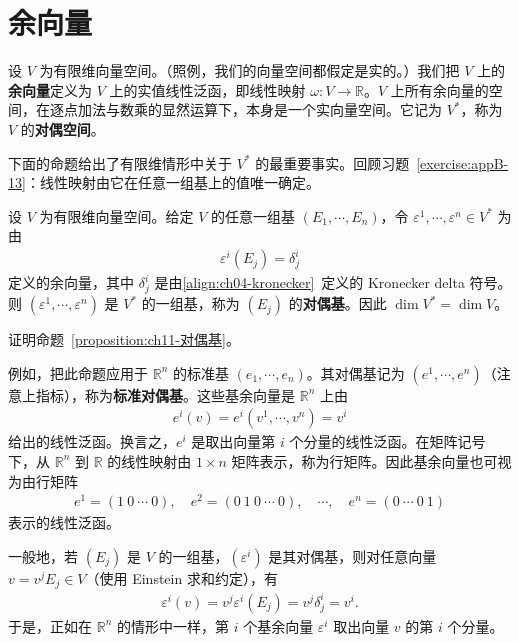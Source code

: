 \documentclass[../../main.tex]{subfiles}
\begin{document}
\section{余向量}\label{section:ch11-余向量}

设 $V$ 为有限维向量空间。（照例，我们的向量空间都假定是实的。）我们把 $V$ 上的\textbf{余向量}定义为 $V$ 上的实值线性泛函，即线性映射 $\omega\colon V\to\mathbb{R}$。$V$ 上所有余向量的空间，在逐点加法与数乘的显然运算下，本身是一个实向量空间。它记为 $V^*$，称为 $V$ 的\textbf{对偶空间}。

下面的命题给出了有限维情形中关于 $V^*$ 的最重要事实。回顾习题~\ref{exercise:appB-13}：线性映射由它在任意一组基上的值唯一确定。

\begin{proposition}\label{proposition:ch11-对偶基}
设 $V$ 为有限维向量空间。给定 $V$ 的任意一组基 $(E_1,\cdots ,E_n)$，令 $\varepsilon^1,\cdots ,\varepsilon^n\in V^*$ 为由
\begin{align*}
\varepsilon^i(E_j)=\delta^i_j
\end{align*}
定义的余向量，其中 $\delta^i_j$ 是由\eqref{align:ch04-kronecker}~定义的 Kronecker delta 符号。则 $(\varepsilon^1,\cdots ,\varepsilon^n)$ 是 $V^*$ 的一组基，称为 $(E_j)$ 的\textbf{对偶基}。因此 $\dim V^*=\dim V$。
\end{proposition}

\begin{exercise}\label{exercise:ch11-02}
证明命题~\ref{proposition:ch11-对偶基}。
\end{exercise}

例如，把此命题应用于 $\mathbb{R}^n$ 的标准基 $(e_1,\cdots ,e_n)$。其对偶基记为 $(e^1,\cdots ,e^n)$（注意上指标），称为\textbf{标准对偶基}。这些基余向量是 $\mathbb{R}^n$ 上由
\begin{align*}
e^i(v)=e^i(v^1,\cdots ,v^n)=v^i
\end{align*}
给出的线性泛函。换言之，$e^i$ 是取出向量第 $i$ 个分量的线性泛函。在矩阵记号下，从 $\mathbb{R}^n$ 到 $\mathbb{R}$ 的线性映射由 $1\times n$ 矩阵表示，称为行矩阵。因此基余向量也可视为由行矩阵
\begin{align*}
e^1=(1\ 0\ \cdots\ 0),\quad e^2=(0\ 1\ 0\ \cdots\ 0),\quad \cdots ,\quad e^n=(0\ \cdots\ 0\ 1)
\end{align*}
表示的线性泛函。

一般地，若 $(E_j)$ 是 $V$ 的一组基，$(\varepsilon^i)$ 是其对偶基，则对任意向量 $v=v^jE_j\in V$（使用 Einstein 求和约定），有
\begin{align*}
\varepsilon^i(v)=v^j\varepsilon^i(E_j)=v^j\delta^i_j=v^i.
\end{align*}
于是，正如在 $\mathbb{R}^n$ 的情形中一样，第 $i$ 个基余向量 $\varepsilon^i$ 取出向量 $v$ 的第 $i$ 个分量。
\end{document}
